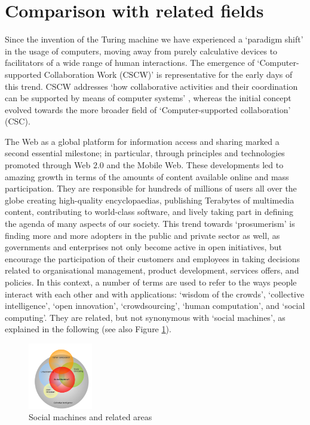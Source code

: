 \documentclass{sig-alternate}
\begin{document}
\section{Comparison with related fields}
\label{sec:comparison}
Since the invention of the Turing machine we have experienced a `paradigm shift' in the usage of computers, moving away from purely calculative devices to facilitators of a wide range of human interactions. The emergence of `Computer-supported Collaboration Work (CSCW)' \cite{grudin1994computer} is representative for the early days of this trend. CSCW addresses `how collaborative activities and their coordination can be supported by means of computer systems' \cite{grudin1994computer}, whereas the initial concept evolved towards the more broader field of `Computer-supported collaboration' (CSC).

The Web as a global platform for information access and sharing marked a second essential milestone; in particular, through principles and technologies promoted through Web $2.0$ and the Mobile Web. These developments led to amazing growth in terms of the amounts of content available online and mass participation. They are responsible for hundreds of millions of users all over the globe creating high-quality encyclopaedias, publishing Terabytes of multimedia content, contributing to world-class software, and lively taking part in defining the agenda of many aspects of our society. This trend towards `prosumerism' is finding more and more adopters in the public and private sector as well, as governments and enterprises not only become active in open initiatives, but encourage the participation of their customers and employees in taking decisions related to organisational management, product development, services offers, and policies. In this context, a number of terms are used to refer to the ways people interact with each other and with applications: `wisdom of the crowds', `collective intelligence', `open innovation', `crowdsourcing', `human computation', and `social computing'. They are related, but not synonymous with `social machines', as explained in the following (see also Figure \ref{fig:socialmachine}).

\begin{figure}[htb]
\begin{center}
\includegraphics[width=0.25\textwidth]{img/socialmachinescope.png}
\caption{Social machines and related areas} \label{fig:socialmachine}
\end{center}
\end{figure}
\end{document}
